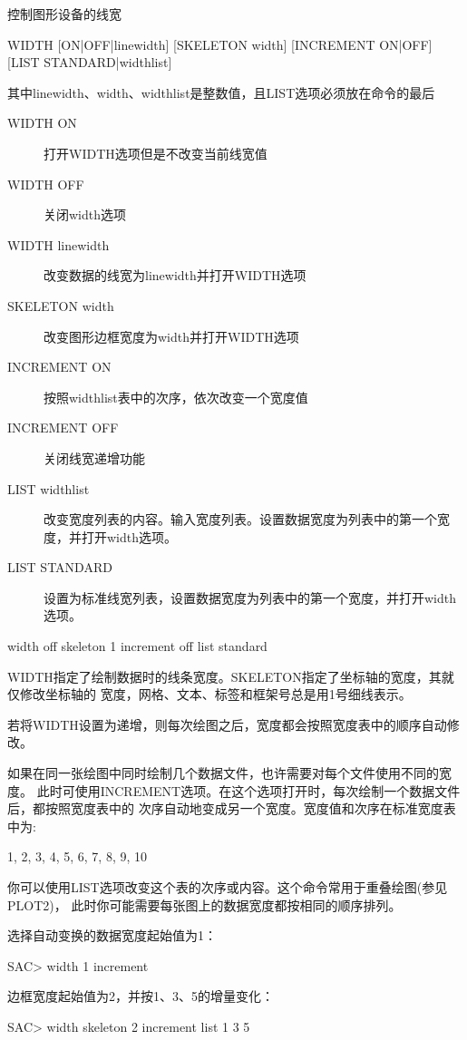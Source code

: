 \label{cmd:width}

控制图形设备的线宽

\begin{SACSTX}
WIDTH [ON|OFF|linewidth] [SKELETON width] [INCREMENT ON|OFF]
    [LIST STANDARD|widthlist]
\end{SACSTX}
其中linewidth、width、widthlist是整数值，且LIST选项必须放在命令的最后

\begin{description}
\item [WIDTH ON] 打开WIDTH选项但是不改变当前线宽值
\item [WIDTH OFF] 关闭width选项
\item [WIDTH linewidth] 改变数据的线宽为linewidth并打开WIDTH选项
\item [SKELETON width] 改变图形边框宽度为width并打开WIDTH选项
\item [INCREMENT ON] 按照widthlist表中的次序，依次改变一个宽度值
\item [INCREMENT OFF] 关闭线宽递增功能
\item [LIST widthlist] 改变宽度列表的内容。输入宽度列表。设置数据宽度为列表中的第一个宽度，并打开width选项。
\item [LIST STANDARD] 设置为标准线宽列表，设置数据宽度为列表中的第一个宽度，并打开width选项。
\end{description}

\begin{SACDFT}
width off skeleton 1 increment off list standard
\end{SACDFT}

WIDTH指定了绘制数据时的线条宽度。SKELETON指定了坐标轴的宽度，其就仅修改坐标轴的
宽度，网格、文本、标签和框架号总是用1号细线表示。

若将WIDTH设置为递增，则每次绘图之后，宽度都会按照宽度表中的顺序自动修改。

如果在同一张绘图中同时绘制几个数据文件，也许需要对每个文件使用不同的宽度。
此时可使用INCREMENT选项。在这个选项打开时，每次绘制一个数据文件后，都按照宽度表中的
次序自动地变成另一个宽度。宽度值和次序在标准宽度表中为:
\begin{SACCode}
1, 2, 3, 4, 5, 6, 7, 8, 9, 10
\end{SACCode}
你可以使用LIST选项改变这个表的次序或内容。这个命令常用于重叠绘图(参见PLOT2)，
此时你可能需要每张图上的数据宽度都按相同的顺序排列。

选择自动变换的数据宽度起始值为1：
\begin{SACCode}
SAC> width 1 increment
\end{SACCode}

边框宽度起始值为2，并按1、3、5的增量变化：
\begin{SACCode}
SAC> width skeleton 2 increment list 1 3 5
\end{SACCode}
